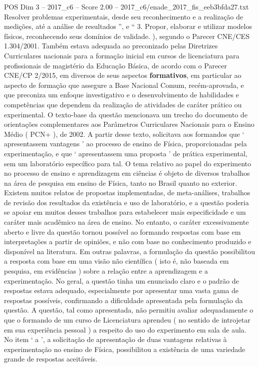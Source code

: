\begin{textsample}{POS Dim 3 – 2017\_c6 – Score 2.00 – 2017\_c6/enade\_2017\_fis\_eeb3bfda27.txt}
Resolver problemas experimentais, desde seu reconhecimento e a realização de medições, até a análise de resultados ”, e “ 3.
Propor, elaborar e utilizar modelos físicos, reconhecendo seus domínios de validade. ), segundo o Parecer CNE/CES 1.304/2001.
Também estava adequada ao preconizado pelas Diretrizes Curriculares nacionais para a formação inicial em cursos de licenciatura para profissionais de magistério da Educação Básica, de acordo com o Parecer CNE/CP 2/2015, em diversos de seus aspectos \textbf{formativos}, em particular ao aspecto de formação que assegure a Base Nacional Comum, recém-aprovada, e que preconiza um enfoque investigativo e o desenvolvimento de habilidades e competências que dependem da realização de atividades de caráter prático ou experimental.
O texto-base da questão mencionava um trecho do documento de orientações complementares aos Parâmetros Curriculares Nacionais para o Ensino Médio ( PCN+ ), de 2002.
A partir desse texto, solicitava aos formandos que ‘ apresentassem vantagens ’ ao processo de ensino de Física, proporcionadas pela experimentação, e que ‘ apresentassem uma proposta ’ de prática experimental, sem um laboratório específico para tal.
O tema relativo ao papel do experimento no processo de ensino e aprendizagem em ciências é objeto de diversos trabalhos na área de pesquisa em ensino de Física, tanto no Brasil quanto no exterior.
Existem muitos relatos de propostas implementadas, de meta-análises, trabalhos de revisão dos resultados da existência e uso de laboratório, e a questão poderia se apoiar em muitos desses trabalhos para estabelecer mais especificidade e um caráter mais acadêmico na área de ensino.
No entanto, o caráter excessivamente aberto e livre da questão tornou possível ao formando respostas com base em interpretações a partir de opiniões, e não com base no conhecimento produzido e disponível na literatura.
Em outras palavras, a formulação da questão possibilitou a resposta com base em uma visão não científica ( isto é, não baseada em pesquisa, em evidências ) sobre a relação entre a aprendizagem e a experimentação.
No geral, a questão tinha um enunciado claro e o padrão de respostas estava adequado, especialmente por apresentar uma vasta gama de respostas possíveis, confirmando a dificuldade apresentada pela formulação da questão.
A questão, tal como apresentada, não permitiu avaliar adequadamente o que o formando de um curso de Licenciatura aprendeu ( no sentido de introjetar em sua experiência pessoal ) a respeito do uso do experimento em sala de aula.
No item ‘ a ’, a solicitação de apresentação de duas vantagens relativas à experimentação no ensino de Física, possibilitou a existência de uma variedade grande de respostas aceitáveis.

\end{textsample}
